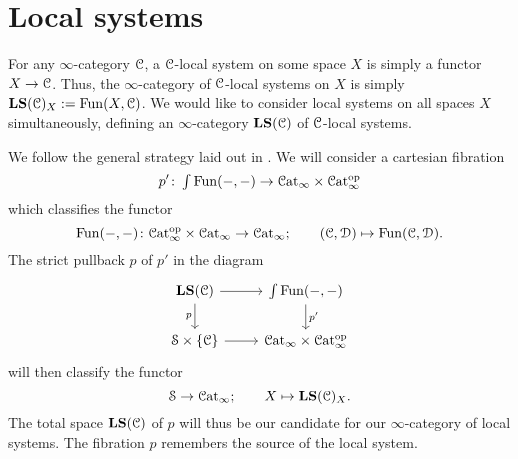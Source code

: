 \documentclass[main.tex]{subfiles}
\begin{document}
\section{Local systems}
\label{sec:local_systems}

For any $\infty$-category $\mathcal{C}$, a $\mathcal{C}$-local system on some space $X$ is simply a functor $X \to \mathcal{C}$. Thus, the $\infty$-category of $\mathcal{C}$-local systems on $X$ is simply $\mathbf{LS}(\mathcal{C})_{X}:=\mathrm{Fun}(X, \mathcal{C})$. We would like to consider local systems on all spaces $X$ simultaneously, defining an $\infty$-category $\mathbf{LS}(\mathcal{C})$ of $\mathcal{C}$-local systems.

We follow the general strategy laid out in \cite{luriehopkins2013ambidexterity}. We will consider a cartesian fibration 
\begin{equation*}
  p'\colon\smallint\Fun(-, -) \to \ICat \times \ICat\op
\end{equation*}
which classifies the functor
\begin{equation*}
  \mathrm{Fun}(-,-)\colon \mathcal{C}\mathrm{at}_{\infty}^{\mathrm{op}} \times \mathcal{C}\mathrm{at}_{\infty} \to \mathcal{C}\mathrm{at}_{\infty};\qquad (\mathcal{C}, \mathcal{D}) \mapsto \mathrm{Fun}(\mathcal{C}, \mathcal{D}).
\end{equation*}
The strict pullback $p$ of $p'$ in the diagram
\begin{equation*}
  \begin{tikzcd}
    \LS(\category{C})
    \arrow[r]
    \arrow[d, swap, "p"]
    & \int\Fun(-, -)
    \arrow[d, "p'"]
    \\
    \S \times \{\category{C}\}
    \arrow[r]
    & \ICat \times \ICat\op
  \end{tikzcd}
\end{equation*}
will then classify the functor
\begin{equation*}
  \mathcal{S} \to \mathcal{C}\mathrm{at}_{\infty};\qquad X \mapsto \mathbf{LS}(\mathcal{C})_{X}.
\end{equation*}
The total space $\mathbf{LS}(\mathcal{C})$ of $p$ will thus be our candidate for our $\infty$-category of local systems. The fibration $p$ remembers the source of the local system.
\end{document}
